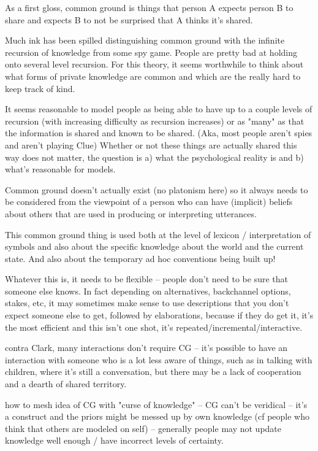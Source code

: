 \documentclass[]{article}
\begin{document}
As a first gloss, common ground is things that person A expects person B to share and expects B to not be surprised that A thinks it's shared. 

Much ink has been spilled distinguishing common ground with the infinite recursion of knowledge from some spy game. People are pretty bad at holding onto several level recursion. For this theory, it seems worthwhile to think about what forms of private knowledge are common and which are the really hard to keep track of kind. 

It seems reasonable to model people as being able to have up to a couple levels of recursion (with increasing difficulty as recursion increases) or as "many" as that the information is shared and known to be shared. (Aka, most people aren't spies and aren't playing Clue) Whether or not these things are actually shared this way does not matter, the question is a) what the psychological reality is and b) what's reasonable for models. 

Common ground doesn't actually exist (no platonism here) so it always needs to be considered from the viewpoint of a person who can have (implicit) beliefs about others that are used in producing or interpreting utterances. 

This common ground thing is used both at the level of lexicon / interpretation of symbols and also about the specific knowledge about the world and the current state. And also about the temporary ad hoc conventions being built up! 

Whatever this is, it needs to be flexible -- people don't need to be sure that someone else knows. In fact depending on alternatives, backchannel options, stakes, etc, it may sometimes make sense to use descriptions that you don't expect someone else to get, followed by elaborations, because if they do get it, it's the most efficient and this isn't one shot, it's repeated/incremental/interactive. 

\cite{clark1996} contra Clark, many interactions don't require CG -- it's possible to have an interaction with someone who is a lot less aware of things, such as in talking with children, where it's still a conversation, but there may be a lack of cooperation and a dearth of shared territory. 

how to mesh idea of CG with "curse of knowledge" -- CG can't be veridical -- it's a construct and the priors might be messed up by own knowledge (cf people who think that others are modeled on self) -- generally  people may not update knowledge well enough / have incorrect levels of certainty. 
\end{document}
